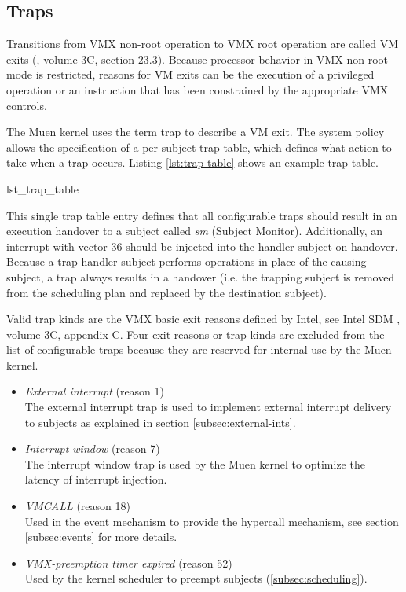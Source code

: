 \subsection{Traps}\label{subsec:traps}
Transitions from VMX non-root operation to VMX root operation are called VM
exits (\cite{IntelSDM}, volume 3C, section 23.3). Because processor behavior in
VMX non-root mode is restricted, reasons for VM exits can be the execution of a
privileged operation or an instruction that has been constrained by the
appropriate VMX controls.

The Muen kernel uses the term trap to describe a VM exit. The system policy
allows the specification of a per-subject trap table, which defines what action
to take when a trap occurs. Listing \ref{lst:trap-table} shows an example trap
table.


	{lst_trap_table}

This single trap table entry defines that all configurable traps should result
in an execution handover to a subject called \emph{sm} (Subject
Monitor). Additionally, an interrupt with vector 36 should be
injected into the handler subject on handover. Because a trap handler subject
performs operations in place of the causing subject, a trap always results in a
handover (i.e. the trapping subject is removed from the scheduling plan and
replaced by the destination subject).

Valid trap kinds are the VMX basic exit reasons defined by Intel, see Intel SDM
\cite{IntelSDM}, volume 3C, appendix C. Four exit reasons or trap kinds are
excluded from the list of configurable traps because they are reserved for
internal use by the Muen kernel.

\begin{itemize}
	\item \emph{External interrupt} (reason 1)\\
		The external interrupt trap is used to implement external interrupt
		delivery to subjects as explained in section \ref{subsec:external-ints}.
	\item \emph{Interrupt window} (reason 7)\\
		The interrupt window trap is used by the Muen kernel to optimize the
		latency of interrupt injection.
	\item \emph{VMCALL} (reason 18)\\
		Used in the event mechanism to provide the hypercall mechanism, see
		section \ref{subsec:events} for more details.
	\item \emph{VMX-preemption timer expired} (reason 52)\\
		Used by the kernel scheduler to preempt subjects
		(\ref{subsec:scheduling}).
\end{itemize}

